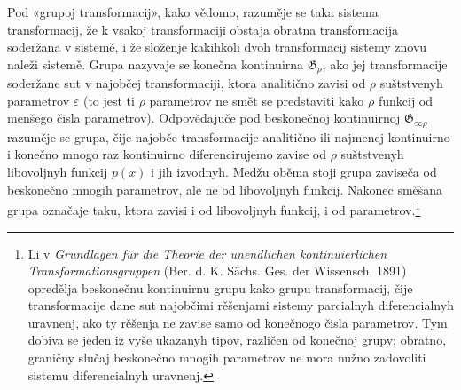 \documentclass[11pt]{article}
\providecommand{\G}{\mathfrak G}
\providecommand{\eps}{\varepsilon}
\begin{document}
Pod «grupoj transformacij», kako vědomo, razuměje se taka sistema transformacij, že k vsakoj transformaciji obstaja obratna transformacija soderžana v sistemě, i že složenje kakihkoli dvoh transformacij sistemy znovu naleži sistemě. Grupa nazyvaje se konečna kontinuirna \(\G_\rho\), ako jej transformacije soderžane sut v najobčej transformaciji, ktora analitično zavisi od \(\rho\) suštstvenyh parametrov \(\eps\) (to jest ti \(\rho\) parametrov ne smět se predstaviti kako \(\rho\) funkcij od menšego čisla parametrov). Odpovědajuče pod beskonečnoj kontinuirnoj \(\G_{\infty\rho}\) razuměje se grupa, čije najobče transformacije analitično ili najmenej kontinuirno i konečno mnogo raz kontinuirno diferencirujemo zavise od \(\rho\) suštstvenyh libovoljnyh funkcij \(p(x)\) i jih izvodnyh. Medžu oběma stoji grupa zaviseča od beskonečno mnogih parametrov, ale ne od libovoljnyh funkcij. Nakonec směšana grupa označaje taku, ktora zavisi i od libovoljnyh funkcij, i od parametrov.\footnote{Li v \emph{Grundlagen für die Theorie der unendlichen kontinuierlichen Transformationsgruppen} (Ber. d. K. Sächs. Ges. der Wissensch. 1891) opredělja beskonečnu kontinuirnu grupu kako grupu transformacij, čije transformacije dane sut najobčimi rěšenjami sistemy parcialnyh diferencialnyh uravnenj, ako ty rěšenja ne zavise samo od konečnogo čisla parametrov. Tym dobiva se jeden iz vyše ukazanyh tipov, različen od konečnoj grupy; obratno, graničny slučaj beskonečno mnogih parametrov ne mora nužno zadovoliti sistemu diferencialnyh uravnenj.}
\end{document}
